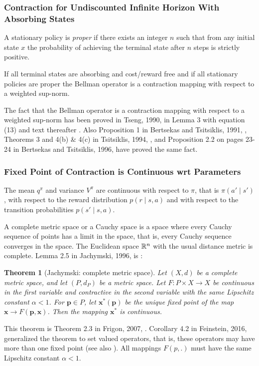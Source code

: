 \documentclass{article}
\newtheorem{theoremA}{Theorem}
\newcommand\Bp{\bm{p}}
\newcommand\Bx{\bm{x}}
\begin{document}
\begin{appendices}
\subsubsection{Contraction for Undiscounted Infinite Horizon With Absorbing States}
\label{sec:ApropPolyCon2}

A stationary policy is {\em proper} if there exists an integer $n$
such that from any initial state $x$ the probability of achieving
the terminal state after $n$ steps is strictly positive.

If all terminal states are absorbing and cost/reward free and
if all stationary policies are proper the Bellman operator is a contraction
mapping with respect to a weighted sup-norm.

The fact that the Bellman operator is a contraction
mapping with respect to a weighted sup-norm
has been proved in Tseng, 1990, in Lemma 3 with equation (13) and
text thereafter \cite{Tseng:90Journal}. Also Proposition 1
in Bertsekas and Tsitsiklis, 1991, \cite{Bertsekas:91},
Theorems 3 and 4(b) \& 4(c) in Tsitsiklis, 1994, \cite{Tsitsiklis:94},
and Proposition 2.2 on pages 23-24 in
Bertsekas and Tsitsiklis, 1996, \cite{Bertsekas:96} have proved
the same fact.


\subsubsection{Fixed Point of Contraction is Continuous wrt Parameters}
\label{sec:ApropPolyFPcon}


The mean  $q^\pi$ and variance $V^{\pi}$ are continuous with respect to $\pi$, that is
$\pi(a' \mid s')$, with
respect to the reward distribution $p(r \mid s,a)$ and with respect to
the transition probabilities $p(s' \mid s,a)$. 

A complete metric space or a Cauchy space is a space where every
Cauchy sequence of points has a limit in the space, that is,
every Cauchy sequence converges in the space.
The Euclidean space $\mathbb{R}^n$  with the usual distance metric is complete.
Lemma 2.5 in Jachymski, 1996, is \cite{Jachymski:96}:
\begin{theoremA}[Jachymski: complete metric space]
Let $(X, d)$ be a complete metric space, and let $(P, d_P)$ be a
metric space. Let $F: P \times X \to X$
be continuous in the first variable and
contractive in the second variable with the same Lipschitz constant
$\alpha <1$. For
$\Bp \in P$, let $\Bx^*(\Bp)$
be the unique fixed point of the map $\Bx \to F(\Bp, \Bx)$. Then the
mapping $\Bx^*$ is continuous.
\end{theoremA}
This theorem is Theorem 2.3 in Frigon, 2007,  \cite{Frigon:07}.
Corollary 4.2 in Feinstein, 2016, generalized the theorem
to set valued operators, that is, these operators may have
more than one fixed point \cite{Feinstein:16}
(see also \cite{Kirr:97}).
All mappings $F(p,.)$ must have the same Lipschitz constant
$\alpha <1$.



\end{appendices}
\end{document}
